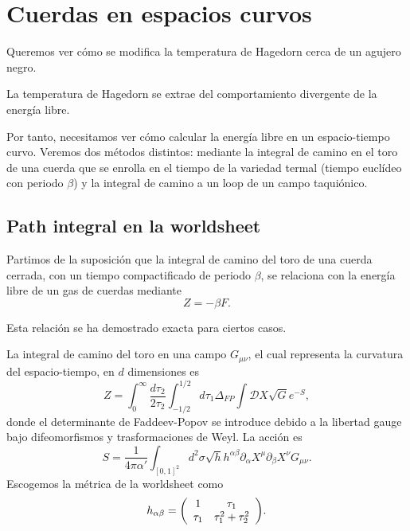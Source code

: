 \chapter{Cuerdas en espacios curvos}

Queremos ver cómo se modifica la temperatura de Hagedorn cerca de un agujero negro.

La temperatura de Hagedorn se extrae del comportamiento divergente de la energía libre.


Por tanto, necesitamos ver cómo calcular la energía libre en un espacio-tiempo curvo.
Veremos dos métodos distintos: mediante la integral de camino en el toro de una cuerda
que se enrolla en el tiempo de la variedad termal (tiempo euclídeo con periodo $\beta$) y
la integral de camino a un loop de un campo taquiónico.

\section{Path integral en la worldsheet}

Partimos de la suposición que la integral de camino del toro de una cuerda cerrada, con
un tiempo compactificado de periodo $\beta$, se relaciona con la energía libre de un gas de cuerdas mediante
\begin{equation}
  Z =  -\beta F.
\end{equation}

Esta relación se ha demostrado exacta para ciertos casos.

La integral de camino del toro en una campo $G_{\mu\nu}$, el cual representa la curvatura
del espacio-tiempo, en $d$ dimensiones es
\begin{equation}
  Z=\int_0^\infty \frac{d\tau_2}{2\tau_2} \int_{-1/2}^{1/2} d\tau_1 \Delta_{FP} \int \mathcal DX
  \sqrt G e^{-S},
  \label{eq:toruspi}
\end{equation}
donde el determinante de Faddeev-Popov se introduce debido a la libertad gauge bajo difeomorfismos
y trasformaciones de Weyl.
La acción es 
\begin{equation}
  S= \frac{1}{4\pi \alpha'}\int_{[0,1]^2} d^2\sigma \sqrt h h^{\alpha\beta} \partial_\alpha X^\mu\partial_\beta X^\nu G_{\mu\nu}.
\end{equation}
Escogemos la métrica de la worldsheet como
\begin{equation}
  h_{\alpha\beta} =
\qty(
\begin{array}{cc}
  1 & \tau_1 \\
  \tau_1 & \tau_1^2+\tau_2^2
\end{array}
).
\end{equation}

